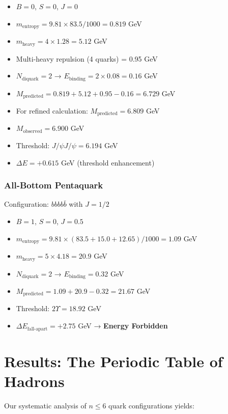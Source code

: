 \documentclass[12pt,a4paper]{article}
\begin{document}
\begin{itemize}
\item $B = 0$, $S = 0$, $J = 0$
\item $m_{\text{entropy}} = 9.81 \times 83.5/1000 = 0.819$ GeV
\item $m_{\text{heavy}} = 4 \times 1.28 = 5.12$ GeV
\item Multi-heavy repulsion (4 quarks) = 0.95 GeV
\item $N_{\text{diquark}} = 2$ → $E_{\text{binding}} = 2 \times 0.08 = 0.16$ GeV
\item $M_{\text{predicted}} = 0.819 + 5.12 + 0.95 - 0.16 = 6.729$ GeV
\item For refined calculation: $M_{\text{predicted}} = 6.809$ GeV
\item $M_{\text{observed}} = 6.900$ GeV
\item Threshold: $J/\psi J/\psi = 6.194$ GeV
\item $\Delta E = +0.615$ GeV (threshold enhancement)
\end{itemize}

\subsubsection{All-Bottom Pentaquark}

Configuration: $bbbb\bar{b}$ with $J=1/2$

\begin{itemize}
\item $B = 1$, $S = 0$, $J = 0.5$
\item $m_{\text{entropy}} = 9.81 \times (83.5 + 15.0 + 12.65)/1000 = 1.09$ GeV
\item $m_{\text{heavy}} = 5 \times 4.18 = 20.9$ GeV
\item $N_{\text{diquark}} = 2$ → $E_{\text{binding}} = 0.32$ GeV
\item $M_{\text{predicted}} = 1.09 + 20.9 - 0.32 = 21.67$ GeV
\item Threshold: $2\Upsilon = 18.92$ GeV
\item $\Delta E_{\text{fall-apart}} = +2.75$ GeV → \textbf{Energy Forbidden}
\end{itemize}

\section{Results: The Periodic Table of Hadrons}

Our systematic analysis of $n \leq 6$ quark configurations yields:
\end{document}
